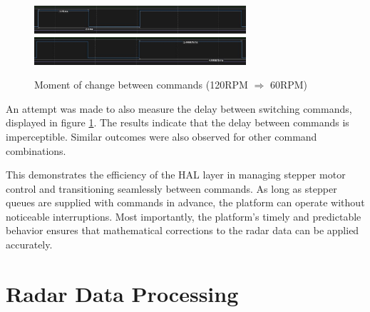 \begin{figure}[h!]
	\centering
	\includegraphics[width=0.7\textwidth]{../img/120rpm_to60_1.jpg}
	\includegraphics[width=0.7\textwidth]{../img/120rpm_to60_2.jpg}
	\caption[Moment of change between commands with 120RPM and 60RPM]{Moment of change between commands (120RPM $\Rightarrow$  60RPM)}
	\label{fig:switching}
\end{figure}

An attempt was made to also measure the delay  between switching commands, displayed in figure \ref{fig:switching}.
The results indicate that the delay between commands is imperceptible.
Similar outcomes were also observed for other command combinations.

This demonstrates the efficiency of the HAL layer in managing stepper motor control and transitioning seamlessly between commands.
As long as stepper queues are supplied with commands in advance, the platform can operate without noticeable interruptions.
Most importantly, the platform’s timely and predictable behavior ensures that mathematical corrections to the radar data can be applied accurately.

\chapter{Radar Data Processing}






\listoffigures

\listoftables

\clearpage
\openright

